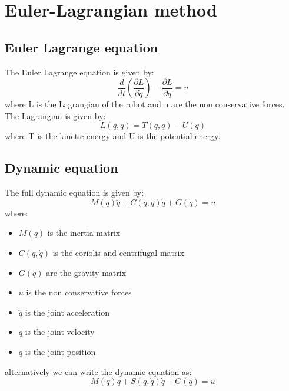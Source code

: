 \documentclass[a4paper,12pt]{article}
\begin{document}
\section{Euler-Lagrangian method}
\subsection{Euler Lagrange equation}
The Euler Lagrange equation is given by:
\begin{equation}
    \frac{d}{dt} \left( \frac{\partial L}{\partial \dot{q}} \right) - \frac{\partial L}{\partial q} = u
\end{equation}
where L is the Lagrangian of the robot and u are the non 
conservative forces.\\
The Lagrangian is given by:
\begin{equation}
    L(q,\dot{q})= T(q,\dot{q}) - U(q)
\end{equation}
where T is the kinetic energy and U is the potential energy.

\subsection{Dynamic equation}
The full dynamic equation is given by:
\begin{equation}
    M(q) \ddot{q} + C(q, \dot{q}) \dot{q} + G(q) = u
\end{equation}
where:
\begin{itemize}
    \item $M(q)$ is the inertia matrix
    \item $C(q, \dot{q})$ is the coriolis and centrifugal matrix
    \item $G(q)$ are the gravity matrix
    \item $u$ is the non conservative forces
    \item $\ddot{q}$ is the joint acceleration
    \item $\dot{q}$ is the joint velocity
    \item $q$ is the joint position
\end{itemize}
alternatively we can write the dynamic equation as:
\begin{equation}
    M(q) \ddot{q} + S(q,\dot{q}) \dot{q} + G(q) = u
\end{equation}
\end{document}
